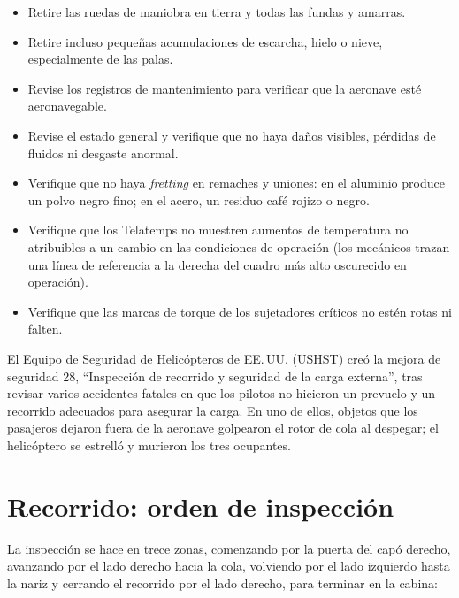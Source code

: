 \begin{itemize}
\item Retire las ruedas de maniobra en tierra y todas las fundas y amarras.
\item Retire incluso pequeñas acumulaciones de escarcha, hielo o nieve, especialmente de las palas.
\item Revise los registros de mantenimiento para verificar que la aeronave esté aeronavegable.
\item Revise el estado general y verifique que no haya daños visibles, pérdidas de fluidos ni desgaste anormal.
\item Verifique que no haya \emph{fretting} en remaches y uniones: en el aluminio produce un polvo negro fino; en el acero, un residuo café rojizo o negro.
\item Verifique que los Telatemps no muestren aumentos de temperatura no atribuibles a un cambio en las condiciones de operación (los mecánicos trazan una línea de referencia a la derecha del cuadro más alto oscurecido en operación).
\item Verifique que las marcas de torque de los sujetadores críticos no estén rotas ni falten.
\end{itemize}

\begin{caso}
El Equipo de Seguridad de Helicópteros de EE.\,UU. (USHST) creó la mejora de seguridad 28, ``Inspección de recorrido y seguridad de la carga externa'', tras revisar varios accidentes fatales en que los pilotos no hicieron un prevuelo y un recorrido adecuados para asegurar la carga. En uno de ellos, objetos que los pasajeros dejaron fuera de la aeronave golpearon el rotor de cola al despegar; el helicóptero se estrelló y murieron los tres ocupantes.
\end{caso}

\section{Recorrido: orden de inspección}

La inspección se hace en trece zonas, comenzando por la puerta del capó derecho, avanzando por el lado derecho hacia la cola, volviendo por el lado izquierdo hasta la nariz y cerrando el recorrido por el lado derecho, para terminar en la cabina:

